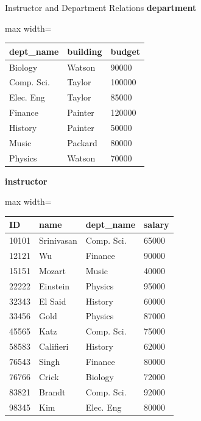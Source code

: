 \documentclass[aspectratio=169, xcolor=dvipsnames]{beamer}
\begin{document}
\begin{frame}{Instructor and Department Relations}
    \textbf{department}
    \vspace{-0.5em}
    \begin{center}
        \begin{adjustbox}{max width=\textwidth}
        \begin{tabular}{|l|l|l|}
        \hline
        \textbf{dept\_name} & \textbf{building} & \textbf{budget} \\ \hline
        Biology & Watson & 90000 \\ \hline
        Comp. Sci. & Taylor & 100000 \\ \hline
        Elec. Eng & Taylor & 85000 \\ \hline
        Finance & Painter & 120000 \\ \hline
        History & Painter & 50000 \\ \hline
        Music & Packard & 80000 \\ \hline
        Physics & Watson & 70000 \\ \hline
        \end{tabular}
        \end{adjustbox}
    \end{center}
    
    \textbf{instructor}
    \vspace{-0.5em}
    \begin{center}
        \begin{adjustbox}{max width=\textwidth}
        \begin{tabular}{|l|l|l|l|}
        \hline
        \textbf{ID} & \textbf{name} & \textbf{dept\_name} & \textbf{salary} \\ \hline
        10101 & Srinivasan & Comp. Sci. & 65000 \\ \hline
        12121 & Wu & Finance & 90000 \\ \hline
        15151 & Mozart & Music & 40000 \\ \hline
        22222 & Einstein & Physics & 95000 \\ \hline
        32343 & El Said & History & 60000 \\ \hline
        33456 & Gold & Physics & 87000 \\ \hline
        45565 & Katz & Comp. Sci. & 75000 \\ \hline
        58583 & Califieri & History & 62000 \\ \hline
        76543 & Singh & Finance & 80000 \\ \hline
        76766 & Crick & Biology & 72000 \\ \hline
        83821 & Brandt & Comp. Sci. & 92000 \\ \hline
        98345 & Kim & Elec. Eng & 80000 \\ \hline
        \end{tabular}
        \end{adjustbox}
    \end{center}
\end{frame}
\end{document}
